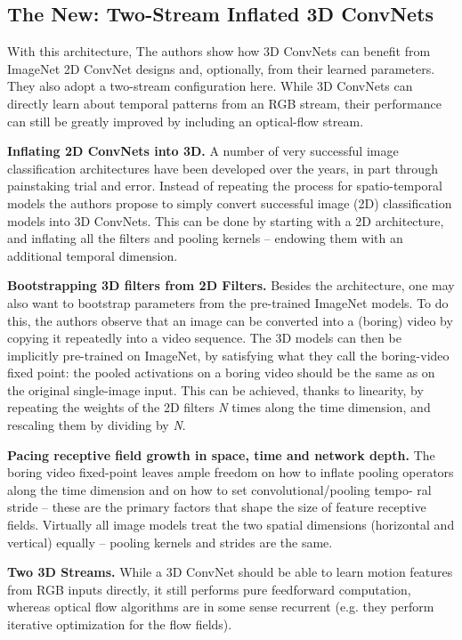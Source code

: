 \documentclass[10pt,twocolumn,letterpaper]{article}
\begin{document}
\subsection{The New: Two-Stream Inflated 3D ConvNets}
With this architecture, The authors show how 3D ConvNets can
benefit from ImageNet 2D ConvNet designs and, 
optionally, from their learned parameters. They also adopt a two-stream configuration here. While 3D ConvNets can directly learn about temporal
patterns from an RGB stream, their performance can still be
greatly improved by including an optical-flow stream.
\par
\noindent \textbf{Inflating 2D ConvNets into 3D.} A number of very 
successful image classification architectures have been developed
over the years, in part through painstaking trial and error.
Instead of repeating the process for spatio-temporal models
the authors propose to simply convert successful image (2D) 
classification models into 3D ConvNets. This can be done by
starting with a 2D architecture, and inflating all the filters
and pooling kernels – endowing them with an additional
temporal dimension.
\par
\noindent \textbf{Bootstrapping 3D filters from 2D Filters.} 
Besides the architecture, one may also want to bootstrap parameters from
the pre-trained ImageNet models. To do this, the authors observe
that an image can be converted into a (boring) video by
copying it repeatedly into a video sequence. The 3D models
can then be implicitly pre-trained on ImageNet, by satisfying 
what they call the boring-video fixed point: the pooled
activations on a boring video should be the same as on the
original single-image input. This can be achieved, thanks to
linearity, by repeating the weights of the 2D filters \textit{N} times
along the time dimension, and rescaling them by dividing
by \textit{N}.
\par
\noindent \textbf{Pacing receptive field growth in space, time and network depth.}
The boring video fixed-point leaves ample
freedom on how to inflate pooling operators along the time
dimension and on how to set convolutional/pooling tempo-
ral stride – these are the primary factors that shape the size
of feature receptive fields. Virtually all image models treat
the two spatial dimensions (horizontal and vertical) equally
– pooling kernels and strides are the same.
\par
\noindent \textbf{Two 3D Streams.}
While a 3D ConvNet should be able to
learn motion features from RGB inputs directly, it still performs pure feedforward computation, whereas optical flow
algorithms are in some sense recurrent (e.g. they perform iterative optimization for the flow fields).


\end{document}
